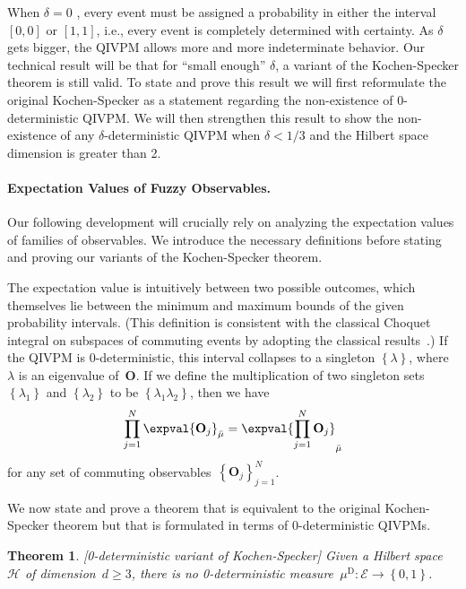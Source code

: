 \documentclass[english,reprint, aps, prl,superscriptaddress, showpacs,
showkeys, longbibliography, amsmath, amssymb]{revtex4-1}
\theoremstyle{plain}
\newtheorem{thm}{Theorem}
\theoremstyle{definition}
\newcommand{\Hilb}{\mathcal{H}}
\newcommand{\events}{\ensuremath{\mathcal{E}}}
\begin{document}
When $\delta=0$ , every event must be assigned a probability in either
the interval $[0,0]$ or $[1,1]$, i.e., every event is completely
determined with certainty. As $\delta$ gets bigger, the QIVPM allows
more and more indeterminate behavior. Our technical result will be
that for ``small enough'' $\delta$, a variant of the Kochen-Specker
theorem is still valid. To state and prove this result we will first
reformulate the original Kochen-Specker as a statement regarding the
non-existence of $0$-deterministic QIVPM. We will then strengthen this
result to show the non-existence of any $\delta$-deterministic QIVPM
when $\delta < 1/3$ and the Hilbert space dimension is greater than
2. 

\paragraph*{Expectation Values of Fuzzy Observables.}  Our following
development will crucially rely on analyzing the expectation values of
families of observables. We introduce the necessary definitions before
stating and proving our variants of the Kochen-Specker theorem.

The expectation value is intuitively between two possible outcomes,
which themselves lie between the minimum and maximum bounds of the
given probability intervals. (This definition is consistent with the
classical Choquet integral on subspaces of commuting events by
adopting the classical
results~\cite{GilboaSchmeidler1994,Grabisch2016}.)  If the QIVPM is
0-deterministic, this interval collapses to a singleton
$\left\{ \lambda\right\} $, where $\lambda$ is an eigenvalue
of~$\mathbf{O}$. If we define the multiplication of two singleton
sets~$\left\{ \lambda_{1}\right\} $ and $\left\{ \lambda_{2}\right\} $
to be $\left\{ \lambda_{1}\lambda_{2}\right\} $, then we have
\begin{equation}
\prod_{j=1}^{N}\expval{\mathbf{O}_{j}}_{\bar{\mu}}=\expval{\prod_{j=1}^{N}\mathbf{O}_{j}}_{\bar{\mu}}\label{eq:Kochen-Specker-Rules}
\end{equation}
for any set of commuting observables~$\left\{ \mathbf{O}_{j}\right\}
_{j=1}^{N}$.

We now state and prove a theorem that is equivalent to the original
Kochen-Specker theorem but that is formulated in terms of
$0$-deterministic QIVPMs. 


\begin{thm}
\label{thm:Kochen-Specker} {\rm [0-deterministic variant of Kochen-Specker]}
Given a Hilbert space $\Hilb$ of dimension~$d\ge3$, there is no
0-deterministic
measure~$\mu^{\mathrm{D}}:\events\rightarrow\left\{ 0,1\right\}$.
\end{thm}
\end{document}
